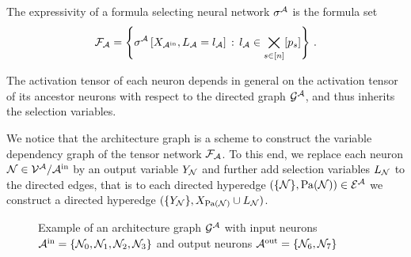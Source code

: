 \begin{definition}
    The expressivity of a formula selecting neural network $\sigma^{\mathcal{A}}$ is the formula set
    \begin{align*}
        \mathcal{F}_{\mathcal{A}} = \left\{ \sigma^{\mathcal{A}}\left[X_{\mathcal{A}^{\mathrm{in}}},L_{\mathcal{A}}=l_{\mathcal{A}}\right]  \,:\, l_{\mathcal{A}}\in\bigtimes_{s\in[n]}[p_{s}] \right\} \, .
    \end{align*}

\end{definition}

The activation tensor of each neuron depends in general on the activation tensor of its ancestor neurons with respect to the directed graph $\mathcal{G}^{\mathcal{A}}$, and thus inherits the selection variables.

We notice that the architecture graph is a scheme to construct the variable dependency graph of the tensor network $\mathcal{F}_{\mathcal{A}}$.
To this end, we replace each neuron $\mathcal{N}\in\mathcal{V}^{\mathcal{A}}/\mathcal{A}^{\mathrm{in}}$ by an output variable $Y_{\mathcal{N}}$ and further add selection variables $L_{\mathcal{N}}$ to the directed edges, that is to each directed hyperedge $(\{\mathcal{N}\}, \mathrm{Pa}(\mathcal{N}))\in\mathcal{E}^{\mathcal{A}}$ we construct a directed hyperedge $(\{Y_{\mathcal{N}}\}, X_{\mathrm{Pa}(\mathcal{N})}\cup L_{\mathcal{N}})$.

\begin{figure}[t]
    \begin{center}
        
    \end{center}
    \caption{Example of an architecture graph $\mathcal{G}^{\mathcal{A}}$ with input neurons $\mathcal{A}^{\mathrm{in}}=\{\mathcal{N}_{0},\mathcal{N}_{1},\mathcal{N}_{2},\mathcal{N}_{3}\}$ and output neurons $\mathcal{A}^{\mathrm{out}}=\{\mathcal{N}_{6},\mathcal{N}_{7}\}$
    }
    \label{fig:architectureGraph}
\end{figure}


